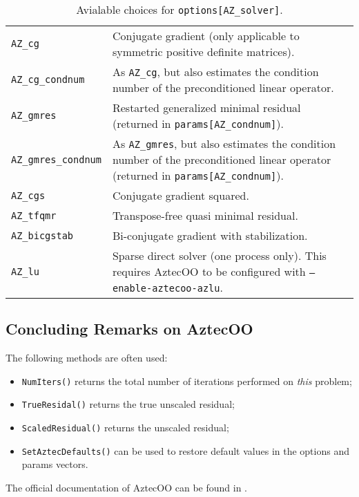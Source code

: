 \begin{table}
\begin{center}
\begin{tabular}{ | p{5cm} | p{10cm} | }
\hline
\verb!AZ_cg! & Conjugate gradient (only applicable to symmetric positive
definite matrices). \\
\verb!AZ_cg_condnum! & As \verb!AZ_cg!, but also estimates the condition
number of the preconditioned linear operator. \\
\verb!AZ_gmres! & Restarted generalized minimal residual (returned in
\verb!params[AZ_condnum]!). \\ 
\verb!AZ_gmres_condnum! & As \verb!AZ_gmres!, but also estimates the condition
number of the preconditioned linear operator  (returned in
\verb!params[AZ_condnum]!). \\ 
\verb!AZ_cgs! &  Conjugate gradient squared.\\
\verb!AZ_tfqmr! & Transpose-free quasi minimal residual. \\
\verb!AZ_bicgstab! &  Bi-conjugate gradient with stabilization.\\
\verb!AZ_lu! & Sparse direct solver (one process only). This requires
AztecOO to be configured with {\tt --enable-aztecoo-azlu}. \\
\hline
\end{tabular}
\caption{Avialable choices for {\tt options[AZ\_solver]}.}
\label{tab:aztec:solver}
\end{center}
\end{table}


\subsection{Concluding Remarks on AztecOO}

The following methods are often used:
\begin{itemize}
\item \verb!NumIters()! returns the total number of iterations performed
  on {\sl this} problem;
\item \verb!TrueResidal()! returns the true unscaled residual;
\item \verb!ScaledResidual()! returns the unscaled residual;
\item \verb!SetAztecDefaults()! can be used to restore default values in
  the options and params vectors.
\end{itemize}

The official documentation of AztecOO can be found in
\cite{AztecOO-Users-Guide}.

